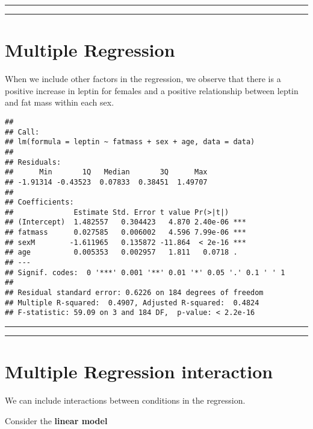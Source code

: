 \documentclass[
]{book}
\begin{document}
\begin{center}\rule{0.5\linewidth}{0.5pt}\end{center}

\begin{center}\rule{0.5\linewidth}{0.5pt}\end{center}

\hypertarget{multiple-regression-4}{%
\section{Multiple Regression}\label{multiple-regression-4}}

When we include other factors in the regression, we observe that there is a positive increase in leptin for females and a positive relationship between leptin and fat mass within each sex.

\begin{verbatim}
## 
## Call:
## lm(formula = leptin ~ fatmass + sex + age, data = data)
## 
## Residuals:
##      Min       1Q   Median       3Q      Max 
## -1.91314 -0.43523  0.07833  0.38451  1.49707 
## 
## Coefficients:
##              Estimate Std. Error t value Pr(>|t|)    
## (Intercept)  1.482557   0.304423   4.870 2.40e-06 ***
## fatmass      0.027585   0.006002   4.596 7.99e-06 ***
## sexM        -1.611965   0.135872 -11.864  < 2e-16 ***
## age          0.005353   0.002957   1.811   0.0718 .  
## ---
## Signif. codes:  0 '***' 0.001 '**' 0.01 '*' 0.05 '.' 0.1 ' ' 1
## 
## Residual standard error: 0.6226 on 184 degrees of freedom
## Multiple R-squared:  0.4907, Adjusted R-squared:  0.4824 
## F-statistic: 59.09 on 3 and 184 DF,  p-value: < 2.2e-16
\end{verbatim}

\begin{center}\rule{0.5\linewidth}{0.5pt}\end{center}

\begin{center}\rule{0.5\linewidth}{0.5pt}\end{center}

\hypertarget{multiple-regression-interaction}{%
\section{Multiple Regression interaction}\label{multiple-regression-interaction}}

We can include interactions between conditions in the regression.

Consider the \textbf{linear model}
\end{document}
